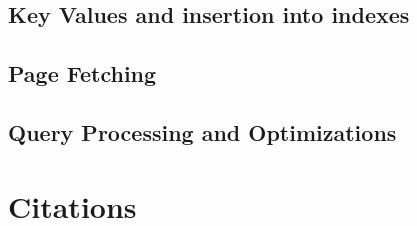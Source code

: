 \documentclass{dependencies/acm_proc_article-sp}
\begin{document}
\subsection{Key Values and insertion into indexes}
\subsection{Page Fetching}
\subsection{Query Processing and Optimizations}

\section{Citations}
%

%
%
\balancecolumns
\end{document}
